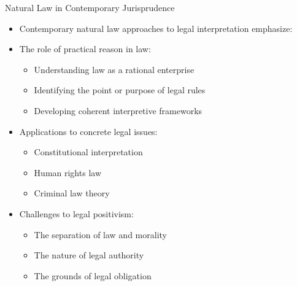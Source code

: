 \documentclass{beamer}
\begin{document}
\begin{frame}{Natural Law in Contemporary Jurisprudence}
    \begin{itemize}
        \item Contemporary natural law approaches to legal interpretation emphasize:
        
        \item The role of practical reason in law:
        \begin{itemize}
            \item Understanding law as a rational enterprise
            \item Identifying the point or purpose of legal rules
            \item Developing coherent interpretive frameworks
        \end{itemize}
        
        \item Applications to concrete legal issues:
            \begin{itemize}
                \item Constitutional interpretation
                \item Human rights law
                \item Criminal law theory
            \end{itemize}
        
        \item Challenges to legal positivism:
            \begin{itemize}
                \item The separation of law and morality
                \item The nature of legal authority
                \item The grounds of legal obligation
            \end{itemize}
    \end{itemize}
\end{frame}
\end{document}
